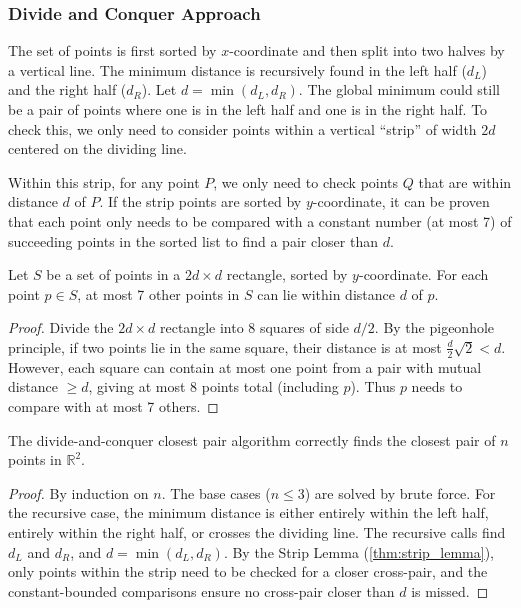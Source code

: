 \subsubsection*{Divide and Conquer Approach}

The set of points is first sorted by $x$-coordinate and then split into two halves by a vertical line. The minimum distance is recursively found in the left half ($d_L$) and the right half ($d_R$). Let $d = \min(d_L, d_R)$. The global minimum could still be a pair of points where one is in the left half and one is in the right half. To check this, we only need to consider points within a vertical ``strip'' of width $2d$ centered on the dividing line.

Within this strip, for any point $P$, we only need to check points $Q$ that are within distance $d$ of $P$. If the strip points are sorted by $y$-coordinate, it can be proven that each point only needs to be compared with a constant number (at most 7) of succeeding points in the sorted list to find a pair closer than $d$.

\begin{theorem}\label{thm:strip_lemma}
Let $S$ be a set of points in a $2d \times d$ rectangle, sorted by $y$-coordinate. For each point $p \in S$, at most 7 other points in $S$ can lie within distance $d$ of $p$.
\end{theorem}
\begin{proof}
Divide the $2d \times d$ rectangle into 8 squares of side $d/2$. By the pigeonhole principle, if two points lie in the same square, their distance is at most $\frac{d}{2}\sqrt{2} < d$. However, each square can contain at most one point from a pair with mutual distance $\ge d$, giving at most 8 points total (including $p$). Thus $p$ needs to compare with at most 7 others.
\end{proof}

\begin{theorem}\label{thm:closest_pair_correctness}
The divide-and-conquer closest pair algorithm correctly finds the closest pair of $n$ points in $\mathbb{R}^2$.
\end{theorem}
\begin{proof}
By induction on $n$. The base cases ($n \le 3$) are solved by brute force. For the recursive case, the minimum distance is either entirely within the left half, entirely within the right half, or crosses the dividing line. The recursive calls find $d_L$ and $d_R$, and $d = \min(d_L, d_R)$. By the Strip Lemma (\cref{thm:strip_lemma}), only points within the strip need to be checked for a closer cross-pair, and the constant-bounded comparisons ensure no cross-pair closer than $d$ is missed.
\end{proof}

